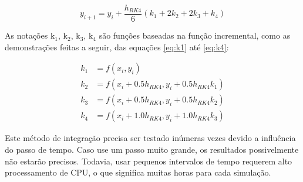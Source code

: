 \begin{equation}
    \label{eq:rk4-completo}
    y_{i+1} = y_{i} + \frac{h_{RK4}}{6}(k_{1}+2k_{2}+2k_{3}+k_{4})
\end{equation}

As notações $\text{k}_{1}$, $\text{k}_{2}$, $\text{k}_{3}$, $\text{k}_{4}$ são funções baseadas na função incremental, como as demonstrações feitas a seguir, das equações \ref{eq:k1} até \ref{eq:k4}:

\begin{subequations}\label{eq:rk4-termos-k1-ate-k4}
\begin{align}
    \label{eq:k1}
    k_{1} &= f(x_{i},y_{i}) \\
    \label{eq:k2}
    k_{2} &= f(x_{i}+\num{0,5}h_{RK4},y_{i}+\num{0,5}h_{RK4}k_{1}) \\
    \label{eq:k3}
    k_{3} &= f(x_{i}+\num{0,5}h_{RK4},y_{i}+\num{0,5}h_{RK4}k_{2}) \\
    \label{eq:k4}
    k_{4} &= f(x_{i}+\num{1,0}h_{RK4},y_{i}+\num{1,0}h_{RK4}k_{3}) 
\end{align}
\end{subequations}

Este método de integração precisa ser testado inúmeras vezes devido a influência do passo de tempo. Caso use um passo muito grande, os resultados possivelmente não estarão precisos. Todavia, usar pequenos intervalos de tempo requerem alto processamento de CPU, o que significa muitas horas para cada simulação.